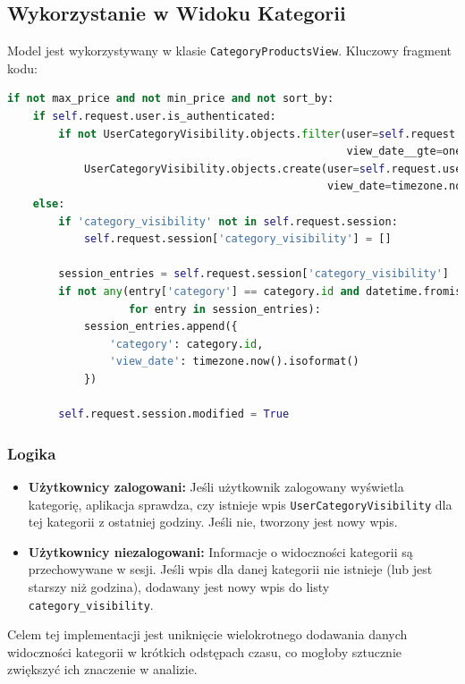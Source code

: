 \documentclass[12pt,a4paper,oneside]{article}
\theoremstyle{definition}
\numberwithin{equation}{section}
\begin{document}
\subsection{Wykorzystanie w Widoku Kategorii}
Model jest wykorzystywany w klasie \texttt{CategoryProductsView}. Kluczowy fragment kodu:\par
\begin{lstlisting}[language=Python]
if not max_price and not min_price and not sort_by:
    if self.request.user.is_authenticated:
        if not UserCategoryVisibility.objects.filter(user=self.request.user, category=category,
                                                     view_date__gte=one_hour_ago).exists():
            UserCategoryVisibility.objects.create(user=self.request.user, category=category,
                                                  view_date=timezone.now())
    else:
        if 'category_visibility' not in self.request.session:
            self.request.session['category_visibility'] = []

        session_entries = self.request.session['category_visibility']
        if not any(entry['category'] == category.id and datetime.fromisoformat(entry['view_date']) >= one_hour_ago
                   for entry in session_entries):
            session_entries.append({
                'category': category.id,
                'view_date': timezone.now().isoformat()
            })

        self.request.session.modified = True
\end{lstlisting}

\subsubsection{Logika}
\begin{itemize}
    \item \textbf{Użytkownicy zalogowani:} Jeśli użytkownik zalogowany wyświetla kategorię, aplikacja sprawdza, czy istnieje wpis \texttt{UserCategoryVisibility} dla tej kategorii z ostatniej godziny. Jeśli nie, tworzony jest nowy wpis.
    \item \textbf{Użytkownicy niezalogowani:} Informacje o widoczności kategorii są przechowywane w sesji. Jeśli wpis dla danej kategorii nie istnieje (lub jest starszy niż godzina), dodawany jest nowy wpis do listy \texttt{category\_visibility}.
\end{itemize}

Celem tej implementacji jest uniknięcie wielokrotnego dodawania danych widoczności kategorii w krótkich odstępach czasu, co mogłoby sztucznie zwiększyć ich znaczenie w analizie.
\end{document}
